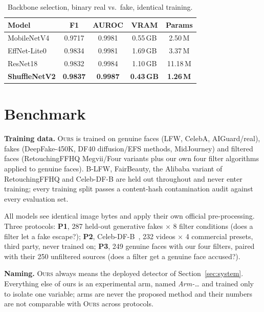 \documentclass[conference]{IEEEtran}
\newcommand{\ours}{\textsc{Ours}}
\newcommand{\win}[1]{\textbf{#1}}
\begin{document}
\begin{table}[t]
\caption{Backbone selection, binary real vs.\ fake, identical training.}
\label{tab:backbone}
\centering\small
\begin{tabular}{@{}lcccc@{}}
\toprule
Model & F1 & AUROC & VRAM & Params \\
\midrule
MobileNetV4        & 0.9717 & 0.9981 & 0.55\,GB & 2.50\,M \\
EffNet-Lite0       & 0.9834 & 0.9981 & 1.69\,GB & 3.37\,M \\
ResNet18           & 0.9832 & 0.9984 & 1.10\,GB & 11.18\,M \\
\textbf{ShuffleNetV2} & \win{0.9837} & \win{0.9987} & \win{0.43\,GB} & \win{1.26\,M} \\
\bottomrule
\end{tabular}
\end{table}

\section{Benchmark}
\textbf{Training data.} \ours{} is trained on genuine faces (LFW, CelebA, AIGuard/real),
fakes (DeepFake-450K, DF40 diffusion/EFS methods, MidJourney) and filtered faces
(RetouchingFFHQ Megvii/Four variants plus our own four filter algorithms applied to genuine
faces). B-LFW, FairBeauty, the Alibaba variant of RetouchingFFHQ and Celeb-DF-B are held out
throughout and never enter training; every training split passes a content-hash contamination
audit against every evaluation set.

All models see identical image bytes and apply their own official pre-processing. Three
protocols: \textbf{P1}, 287 held-out generative fakes $\times$ 8 filter conditions (does a
filter let a fake escape?); \textbf{P2}, Celeb-DF-B~\cite{libourel2024}, 232 videos $\times$
4 commercial presets, third party, never trained on; \textbf{P3}, 249 genuine faces with our
four filters, paired with their 250 unfiltered sources (does a filter get a genuine face
accused?).

\textbf{Naming.} \ours{} always means the deployed detector of Section~\ref{sec:system}.
Everything else of ours is an experimental arm, named \emph{Arm-\ldots} and trained only to
isolate one variable; arms are never the proposed method and their numbers are not comparable
with \ours{} across protocols.
\end{document}

